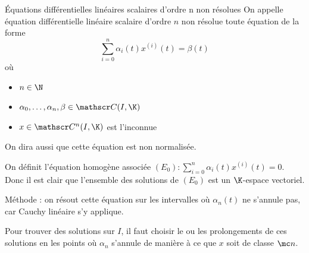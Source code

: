 \lvspace \avspace \begin{definitionnt}{\'Equations différentielles linéaires scalaires d'ordre n non résolues}{}
    On appelle équation différentielle linéaire scalaire d'ordre $n$ non résolue toute
    équation de la forme
    $$\sum_{i=0}^{n} \alpha_i(t) x^{(i)}(t) = \beta(t)$$
    où 
    \begin{itemize}
        \item $n \in \N$
        \item $\alpha_0, \dots, \alpha_n, \beta \in \mathscr C(I, \K)$
        \item $x \in \mathscr C^n(I, \K)$ est l'inconnue
    \end{itemize}

    On dira aussi que cette équation est non normalisée. 

    On définit l'équation homogène associée $(E_0) : \sum_{i = 0}^{n} \alpha_i(t) x^{(i)}(t) = 0$.
    Donc il est clair que l'ensemble des solutions de $(E_0)$ est un $\K$-espace vectoriel.
\end{definitionnt}

Méthode : on résout cette équation sur les intervalles où $\alpha_n(t)$ ne s'annule pas, car 
Cauchy linéaire s'y applique. 

Pour trouver des solutions sur $I$, il faut choisir le ou les prolongements de ces solutions 
en les points où $\alpha_n$ s'annule de manière à ce que $x$ soit de classe $\mc n$.

